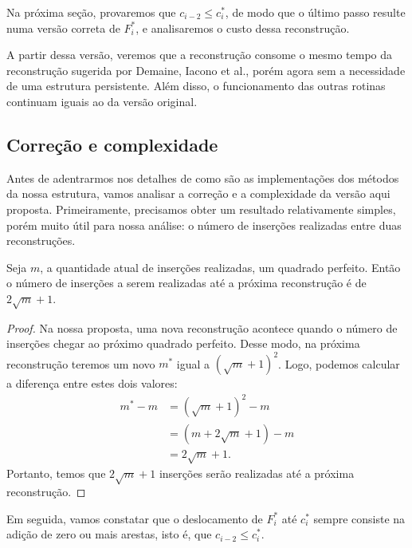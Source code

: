 Na próxima seção, provaremos que $c_{i-2} \leq c^*_i$, de modo que o último passo resulte numa versão correta de $F_i^*$, e analisaremos o custo dessa reconstrução.

A partir dessa versão, veremos que a reconstrução consome o mesmo tempo da reconstrução sugerida por Demaine, Iacono et al., porém agora sem a necessidade de uma estrutura persistente. Além disso, o funcionamento das outras rotinas continuam iguais ao da versão original.

\subsection{Correção e complexidade}
\label{sec:rmsf-complexidade}

Antes de adentrarmos nos detalhes de como são as implementações dos métodos da nossa estrutura, vamos analisar a correção e a complexidade da versão aqui proposta. Primeiramente, precisamos obter um resultado relativamente simples, porém muito útil para nossa análise: o número de inserções realizadas entre duas reconstruções.

\begin{lemma}
    \label{coro:amt-op}
    Seja $m$, a quantidade atual de inserções realizadas, um quadrado perfeito. Então o número de inserções a serem realizadas até a próxima reconstrução é de $2 \sqrt{m} + 1$.
\end{lemma}
\begin{proof}
    Na nossa proposta, uma nova reconstrução acontece quando o número de inserções chegar ao próximo quadrado perfeito. Desse modo, na próxima reconstrução teremos um novo $m^*$ igual a $(\sqrt{m} + 1)^2$. Logo, podemos calcular a diferença entre estes dois valores:
    \begin{align*}
        m^* - m & = (\sqrt{m} + 1)^2 - m    \\
                & = (m + 2\sqrt{m} + 1) - m \\
                & = 2\sqrt{m} + 1.
    \end{align*}
    Portanto, temos que $2\sqrt{m} + 1$ inserções serão realizadas até a próxima reconstrução.
\end{proof}

Em seguida, vamos constatar que o deslocamento de $F_i^*$ até $c_i^*$ sempre consiste na adição de zero ou mais arestas, isto é, que $c_{i-2} \leq c_i^*$.

